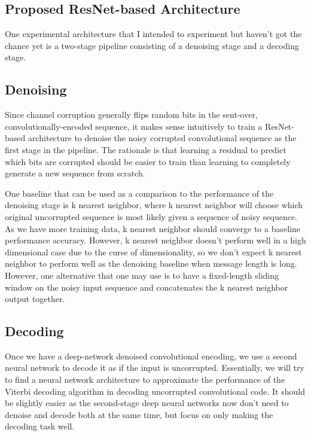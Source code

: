 \documentclass[10pt,twocolumn,letterpaper]{article}
\begin{document}
\subsection{Proposed ResNet-based Architecture}

One experimental architecture that I intended to experiment but haven't got the chance yet is a two-stage pipeline consisting of a denoising stage and a decoding stage.

\subsection{Denoising}

Since channel corruption generally flips random bits in the sent-over, convolutionally-encoded sequence, it makes sense intuitively to train a ResNet-based architecture to denoise the noisy corrupted convolutional sequence as the first stage in the pipeline. The rationale is that learning a residual to predict which bits are corrupted should be easier to train than learning to completely generate a new sequence from scratch.

One baseline that can be used as a comparison to the performance of the denoising stage is k nearest neighbor, where k nearest neighbor will choose which original uncorrupted sequence is most likely given a sequence of noisy sequence. As we have more training data, k nearest neighbor should converge to a baseline performance accuracy. However, k nearest neighbor doesn't perform well in a high dimensional case due to the curse of dimensionality, so we don't expect k nearest neighbor to perform well as the denoising baseline when message length is long. However, one alternative that one may use is to have a fixed-length sliding window on the noisy input sequence and concatenates the k nearest neighbor output together.

\subsection{Decoding}

Once we have a deep-network denoised convolutional encoding, we use a second neural network to decode it as if the input is uncorrupted. Essentially, we will try to find a neural network architecture to approximate the performance of the Viterbi decoding algorithm in decoding uncorrupted convolutional code. It should be slightly easier as the second-stage deep neural networks now don't need to denoise and decode both at the same time, but focus on only making the decoding task well.
\end{document}
